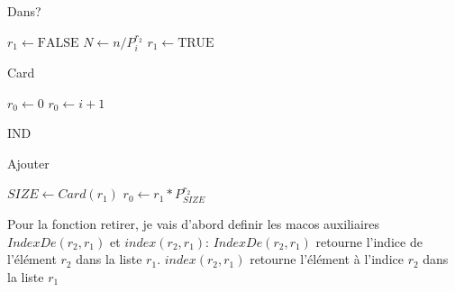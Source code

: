 \documentclass{article}
\begin{document}
    \begin{algorithm}[H]
        \caption{Dans?}\label{Dans?}
        \begin{algorithmic}
        \State $r_1 \gets \text{FALSE}$
         
                \State $\textit{N} \gets n / P_{i}^{r_2}$ 
                 
                    \State $\textit{$r_1$} \gets \text{TRUE}$
                \EndIf
            \EndIf
        \EndFor
        \EndProcedure
        \end{algorithmic}
    \end{algorithm}
    
    \begin{algorithm}[H]
        \caption{Card}\label{Card}
        \begin{algorithmic}
        \State $\textit{$r_0$} \gets \text{0}$
                \State $\textit{$r_0$} \gets \textit{$i$} + 1$
            \EndIf
        \EndFor
        \EndProcedure
        \end{algorithmic}
    \end{algorithm}
    
    \begin{algorithm}[H]IND
        \caption{Ajouter}\label{Ajouter}
        \begin{algorithmic}
        \State $\textit{$SIZE$} \gets Card(r_1)$
        \State $\textit{$r_0$} \gets r_1 * P_{SIZE}^{r_2}$
        \EndProcedure
        \end{algorithmic}
    \end{algorithm}

    Pour la fonction retirer, je vais d'abord definir les macos auxiliaires 
    $IndexDe(r_2, r_1)$ et $index(r_2, r_1)$:
    \newline
    $IndexDe(r_2, r_1)$ retourne l'indice de l'élément $r_2$ dans la liste $r_1$.
    \newline
    $index(r_2, r_1)$ retourne l'élément à l'indice $r_2$ dans la liste $r_1$
\end{document}
